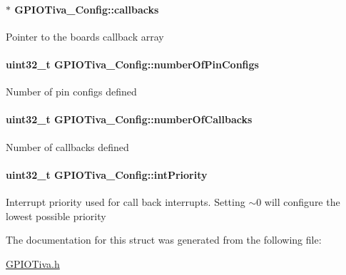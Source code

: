 \paragraph[{callbacks}]{$\ast$ G\+P\+I\+O\+Tiva\+\_\+\+Config\+::callbacks}\label{struct_g_p_i_o_tiva___config_ad6dbaf80b33e7d6d2284bee7c4de6fc1}
Pointer to the board\textquotesingle{}s callback array 
\paragraph[{number\+Of\+Pin\+Configs}]{\setlength{\rightskip}{0pt plus 5cm}uint32\+\_\+t G\+P\+I\+O\+Tiva\+\_\+\+Config\+::number\+Of\+Pin\+Configs}\label{struct_g_p_i_o_tiva___config_ab5a7de155e3541998a41e2bd3099be78}
Number of pin configs defined 
\paragraph[{number\+Of\+Callbacks}]{\setlength{\rightskip}{0pt plus 5cm}uint32\+\_\+t G\+P\+I\+O\+Tiva\+\_\+\+Config\+::number\+Of\+Callbacks}\label{struct_g_p_i_o_tiva___config_aea570ca02796368da46e0b8607851fd9}
Number of callbacks defined 
\paragraph[{int\+Priority}]{\setlength{\rightskip}{0pt plus 5cm}uint32\+\_\+t G\+P\+I\+O\+Tiva\+\_\+\+Config\+::int\+Priority}\label{struct_g_p_i_o_tiva___config_af447c2e65c010edf1653477d27c71476}
Interrupt priority used for call back interrupts. Setting $\sim$0 will configure the lowest possible priority 

The documentation for this struct was generated from the following file\+:\begin{DoxyCompactItemize}
\item 
\hyperlink{_g_p_i_o_tiva_8h}{G\+P\+I\+O\+Tiva.\+h}\end{DoxyCompactItemize}
